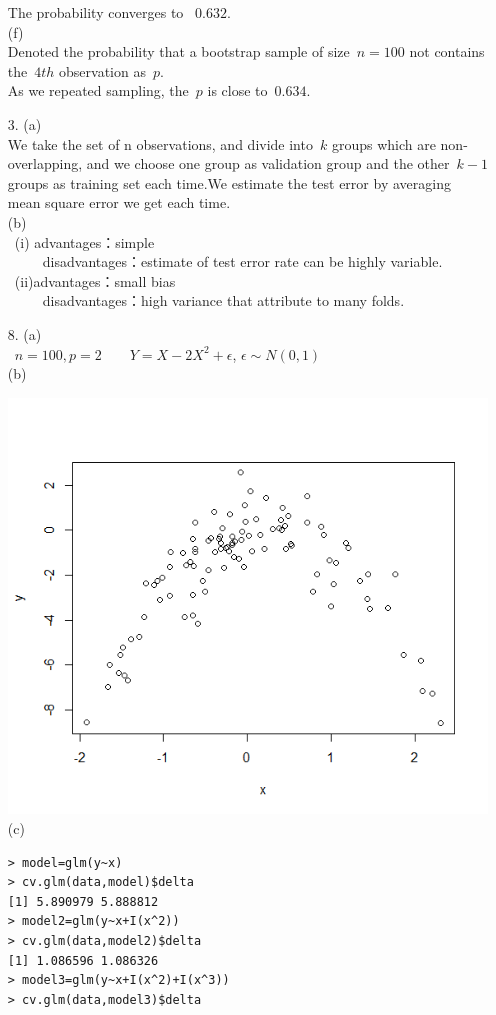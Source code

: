 \documentclass[12pt]{article}}
\begin{document}
\begin{itemize}
The probability converges to \ $0.632$.\\[2ex]
(f)\\
Denoted the probability that a bootstrap sample of size\ $n=100$ not contains the\ $4th$ observation as\ $p$.\\[2ex]
As we repeated sampling, the\ $p$ is close to\ $0.634$.
\item[3.]
(a)\ \\
We take the set of n observations, and divide into\ $k$ groups which are non-overlapping, and we choose one group as validation group and the other\ $k-1$ groups as training set each time.We estimate the test error by averaging mean square error we get each time.\\[3ex]
(b)\ \\
\ (i) advantages：simple\\
\ \ \ \ \ disadvantages：estimate of test error rate can be highly variable.\\
\ (ii)advantages：small bias\\
\ \ \ \ \ disadvantages：high variance that attribute to many folds.
\item[8.]
(a)\ \\
\ $n=100,p=2$\ \ \ \ $Y=X-2X^2+\epsilon$, $\epsilon\sim N(0,1)$\\[2ex]
(b)\\
\raggedright{\includegraphics[width=0.8\linewidth]{square}}\\
(c)
\begin{verbatim}
> model=glm(y~x)
> cv.glm(data,model)$delta
[1] 5.890979 5.888812
> model2=glm(y~x+I(x^2))
> cv.glm(data,model2)$delta
[1] 1.086596 1.086326
> model3=glm(y~x+I(x^2)+I(x^3))
> cv.glm(data,model3)$delta

\end{verbatim}
\end{itemize}
\end{document}
